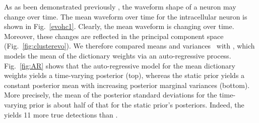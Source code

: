 As as been demonstrated previously \cite{calabrese2011kalman}, the waveform shape of a neuron may change over time.  The mean waveform over time for the intracellular neuron is shown in Fig.\ \ref{evohc1}.  Clearly, the mean waveform is changing over time.  Moreover, these changes are reflected in the principal component space (Fig.\ \ref{fig:clusterevo}).  We therefore compared means and variances \smug\ with \smug{}, which models the mean of the dictionary weights via an auto-regressive process.  Fig.\ \ref{fig:AR} shows that the auto-regressive model for the mean dictionary weights yields a time-varying posterior (top), whereas the static prior yields a constant posterior mean with increasing posterior marginal variances (bottom).  More precisely, the mean of the posterior standard deviations for the time-varying prior is about half of that for the static prior's posteriors. 
Indeed, the \smug{} yields 11 more true detections than \smug.
 

